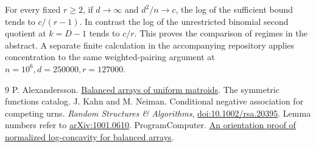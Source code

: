 \documentclass[11pt]{article}
\begin{document}
For every fixed $r\ge2$, if $d\to\infty$ and $d^2/n\to c$, the log of the sufficient bound tends to $c/(r-1)$. In contrast the log of the unrestricted binomial second quotient at $k=D-1$ tends to $c/r$. This proves the comparison of regimes in the abstract. A separate finite calculation in the accompanying repository applies concentration to the same weighted-pairing argument at $n=10^6,d=250000,r=127000$.

\begin{thebibliography}{9}
 P. Alexandersson. \href{https://www.symmetricfunctions.com/realRootedOpenProblems.htm#conjBalancedArrays}{Balanced arrays of uniform matroids}. The symmetric functions catalog.
 J. Kahn and M. Neiman. Conditional negative association for competing urns. \emph{Random Structures \& Algorithms}, \href{https://doi.org/10.1002/rsa.20395}{doi:10.1002/rsa.20395}. Lemma numbers refer to \href{https://arxiv.org/abs/1001.0610}{arXiv:1001.0610}.
 ProgramComputer. \href{https://github.com/ProgramComputer/open-math-research/blob/64b3d20d5fa9a8d2eb502de1531969aff6a0fec4/topics/balanced-arrays/orientation-normalization.md}{An orientation proof of normalized log-concavity for balanced arrays}.
\end{thebibliography}
\end{document}
